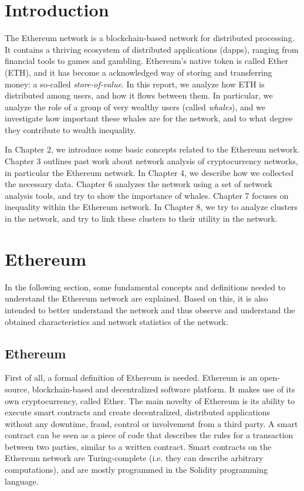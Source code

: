 \documentclass[10pt,a4paper]{article}
\begin{document}
\begin{multicols}{2}

\section{Introduction}
The Ethereum network is a blockchain-based network for distributed processing. It contains a thriving ecosystem of distributed applications (dapps), ranging from financial tools to games and gambling. Ethereum's native token is called Ether (ETH), and it has become a acknowledged way of storing and transferring money: a so-called \textit{store-of-value}. In this report, we analyze how ETH is distributed among users, and how it flows between them. In particular, we analyze the role of a group of very wealthy users (called \textit{whales}), and we investigate how important these whales are for the network, and to what degree they contribute to wealth inequality.

In Chapter 2, we introduce some basic concepts related to the Ethereum network. Chapter 3 outlines past work about network analysis of cryptocurrency networks, in particular the Ethereum network. In Chapter 4, we describe how we collected the necessary data. Chapter 6 analyzes the network using a set of network analysis tools, and try to show the importance of whales. Chapter 7 focuses on inequality within the Ethereum network. In Chapter 8, we try to analyze clusters in the network, and try to link these clusters to their utility in the network. 

\section{Ethereum}

In the following section, some fundamental concepts and definitions needed to understand the Ethereum network are explained. Based on this, it is also intended to better understand the network and thus observe and understand the obtained characteristics and network statistics of the network. 

\subsection{Ethereum}
First of all, a formal definition of Ethereum is needed. Ethereum is an open-source, blockchain-based and decentralized software platform. It makes use of its own cryptocurrency, called Ether. The main novelty of Ethereum is its ability to execute smart contracts and create decentralized, distributed applications without any downtime, fraud, control or involvement from a third party. A smart contract can be seen as a piece of code that describes the rules for a transaction between two parties, similar to a written contract. Smart contracts on the Ethereum network are Turing-complete (i.e. they can describe arbitrary computations), and are mostly programmed in the Solidity programming language. 

\end{multicols}
\end{document}
